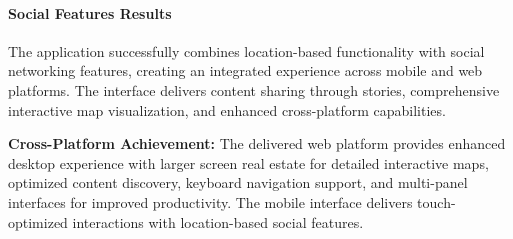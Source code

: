 \paragraph{Social Features Results}
The application successfully combines location-based functionality with social networking features, creating an integrated experience across mobile and web platforms. The interface delivers content sharing through stories, comprehensive interactive map visualization, and enhanced cross-platform capabilities.

\textbf{Cross-Platform Achievement:}
The delivered web platform provides enhanced desktop experience with larger screen real estate for detailed interactive maps, optimized content discovery, keyboard navigation support, and multi-panel interfaces for improved productivity. The mobile interface delivers touch-optimized interactions with location-based social features.


